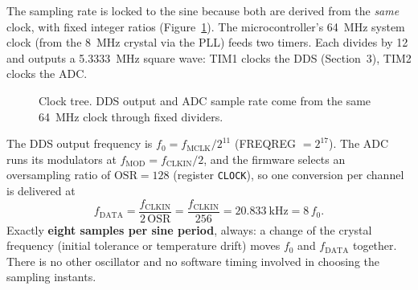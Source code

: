 \documentclass[11pt,a4paper]{article}
\begin{document}
The sampling rate is locked to the sine because both are derived from the
\emph{same} clock, with fixed integer ratios (Figure~\ref{fig:clocks}).  The
microcontroller's \SI{64}{\mega\hertz} system clock (from the
\SI{8}{\mega\hertz} crystal via the PLL) feeds two timers.  Each divides by 12
and outputs a \SI{5.3333}{\mega\hertz} square wave: TIM1 clocks the DDS
(Section~3), TIM2 clocks the ADC.

\begin{figure}[ht]
\centering
{}
\caption{Clock tree.  DDS output and ADC sample rate come from the same
         \SI{64}{\mega\hertz} clock through fixed dividers.}
\label{fig:clocks}
\end{figure}

The DDS output frequency is $f_0=f_{\mathrm{MCLK}}/2^{11}$ (FREQREG $=2^{17}$).
The ADC runs its modulators at $f_{\mathrm{MOD}}=f_{\mathrm{CLKIN}}/2$, and the
firmware selects an oversampling ratio of $\mathrm{OSR}=128$ (register
\texttt{CLOCK}), so one conversion per channel is delivered at
\begin{equation}
  f_{\mathrm{DATA}} = \frac{f_{\mathrm{CLKIN}}}{2\,\mathrm{OSR}}
  = \frac{f_{\mathrm{CLKIN}}}{256} = \SI{20.833}{\kilo\hertz}
  = 8\,f_0 .
\end{equation}
Exactly \textbf{eight samples per sine period}, always: a change of the
crystal frequency (initial tolerance or temperature drift) moves $f_0$ and
$f_{\mathrm{DATA}}$ together.  There is no other oscillator and no software
timing involved in choosing the sampling instants.
\end{document}
